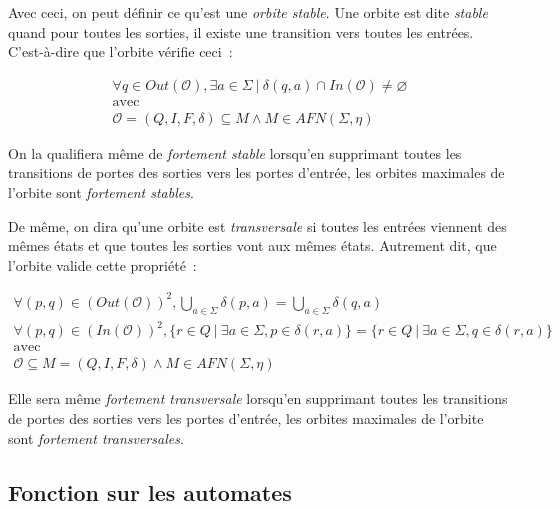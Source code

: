 \begin{definition}
    Avec ceci, on peut définir ce qu'est une \textit{orbite stable}. Une orbite
    est dite \textit{stable} quand pour toutes les sorties, il existe une
    transition vers toutes les entrées. C'est-à-dire que l'orbite vérifie
    ceci~:

    \begin{gather*}
        \forall q \in Out(\mathcal{O}), \exists a \in \Sigma ~|~ \delta(q, a) \cap In(\mathcal{O}) \neq \varnothing \\
        \text{avec} \\
        \mathcal{O} = (Q, I, F, \delta) \subseteq M \land M \in AFN(\Sigma, \eta)
    \end{gather*}

    \noindent On la qualifiera même de \textit{fortement stable} lorsqu'en
    supprimant toutes les transitions de portes des sorties vers les portes
    d'entrée, les orbites maximales de l'orbite sont \textit{fortement stables}.
\end{definition}

\begin{definition}
    De même, on dira qu'une orbite est \textit{transversale} si toutes les
    entrées viennent des mêmes états et que toutes les sorties vont aux mêmes
    états. Autrement dit, que l'orbite valide cette propriété~:

    \begin{gather*}
        \forall (p, q) \in (Out(\mathcal{O}))^2, \bigcup_{a \in \Sigma} \delta(p, a) = \bigcup_{a \in \Sigma} \delta(q, a) \\
        \forall (p, q) \in (In(\mathcal{O}))^2, \{r \in Q ~|~ \exists a \in \Sigma, p \in \delta(r, a)\} = \{r \in Q ~|~ \exists a \in \Sigma, q \in \delta(r, a)\} \\
        \text{avec} \\
        \mathcal{O} \subseteq M = (Q, I, F, \delta) \land M \in AFN(\Sigma, \eta)
    \end{gather*}

    \noindent Elle sera même \textit{fortement transversale} lorsqu'en
    supprimant toutes les transitions de portes des sorties vers les portes
    d'entrée, les orbites maximales de l'orbite sont
    \textit{fortement transversales}.
\end{definition}

\subsection{Fonction sur les automates}

